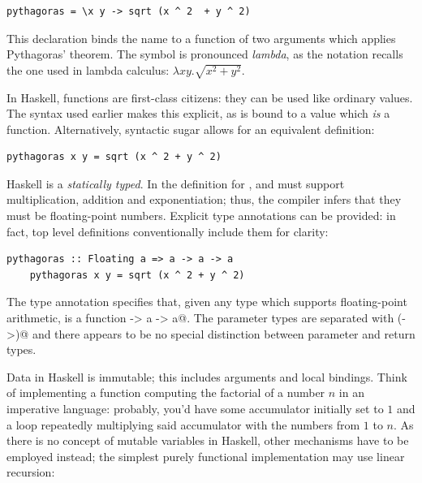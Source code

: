 \documentclass[UdineBachThesis,american,11pt]{PhdThesis}
\begin{document}
  \begin{lstlisting}[gobble=4,basicstyle=\ttfamily\small]
    pythagoras = \x y -> sqrt (x ^ 2  + y ^ 2)
  \end{lstlisting}

  \newpage

  This declaration binds the name \lstinline@pythagoras@ to a function of two
  arguments which applies Pythagoras' theorem. The symbol \lstinline@\@ is
  pronounced \emph{lambda}, as the notation recalls the one used in lambda
  calculus: $\lambda x y . \sqrt{x^2 + y^2}$.

  In Haskell, functions are first-class citizens: they can be used like ordinary
  values. The syntax used earlier makes this explicit, as \lstinline@pythagoras@
  is bound to a value which \emph{is} a function. Alternatively, syntactic sugar
  allows for an equivalent definition:

  \begin{lstlisting}[gobble=4,basicstyle=\ttfamily\small]
    pythagoras x y = sqrt (x ^ 2 + y ^ 2)
  \end{lstlisting}

  Haskell is a \emph{statically typed}. In the definition for
  \lstinline@pythagoras@, \lstinline@x@ and \lstinline@y@ must support
  multiplication, addition and exponentiation; thus, the compiler infers that
  they must be floating-point numbers. Explicit type annotations can be
  provided: in fact, top level definitions conventionally include them for
  clarity:

  \begin{lstlisting}[gobble=4,basicstyle=\ttfamily\small]
    pythagoras :: Floating a => a -> a -> a
    pythagoras x y = sqrt (x ^ 2 + y ^ 2)
  \end{lstlisting}

  The type annotation specifies that, given any type \lstinline@a@ which
  supports floating-point arithmetic, \lstinline@pythagoras@ is a function
  \lstinline@a -> a -> a@. The parameter types are separated with
  \lstinline@(->)@ and there appears to be no special distinction between
  parameter and return types.

  Data in Haskell is immutable; this includes arguments and local bindings.
  Think of implementing a function computing the factorial of a number $n$ in an
  imperative language: probably, you'd have some accumulator initially set to
  $1$ and a loop repeatedly multiplying said accumulator with the numbers from
  $1$ to $n$. As there is no concept of mutable variables in Haskell, other
  mechanisms have to be employed instead; the simplest purely functional
  implementation may use linear recursion:
\end{document}
